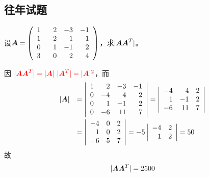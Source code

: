 \subsection{往年试题}

\begin{frame}  
    \begin{li}[2005－2006第二学期]
      设$\boldsymbol{A}=\left(
      \begin{array}{rrrr}
        1&2&-3&-1\\
        1&-2&1&1\\
        0&1&-1&2\\
        3&0&2&4
      \end{array}
      \right)$，求$|\boldsymbol{A}\boldsymbol{A}^T|$。
    \end{li}
    \pause

    \begin{jie}
    因
    $\textcolor{red}{
    |\boldsymbol{A}\boldsymbol{A}^T|=|\boldsymbol{A}|~|\boldsymbol{A}^T|=|\boldsymbol{A}|^2}
    $，而
    $$
    \begin{array}{rl}
      |\boldsymbol{A}|&=\left|
      \begin{array}{rrrr}
        1&2&-3&-1\\
        0&-4&4&2\\
        0&1&-1&2\\
        0&-6&11&7
      \end{array}
      \right|=\left|
      \begin{array}{rrr}
        -4&4&2\\
        1&-1&2\\
        -6&11&7
      \end{array}
      \right|\\[0.3in]
      &=\left|
      \begin{array}{rrr}
        -4&0&2\\
        1&0&2\\
        -6&5&7
      \end{array}
      \right|=-5\left|
      \begin{array}{rrr}
        -4&2\\
        1&2\\
      \end{array}
      \right|=50
    \end{array}
    $$
    故$$|\boldsymbol{A}\boldsymbol{A}^T|=2500$$
  \end{jie}
\end{frame}


